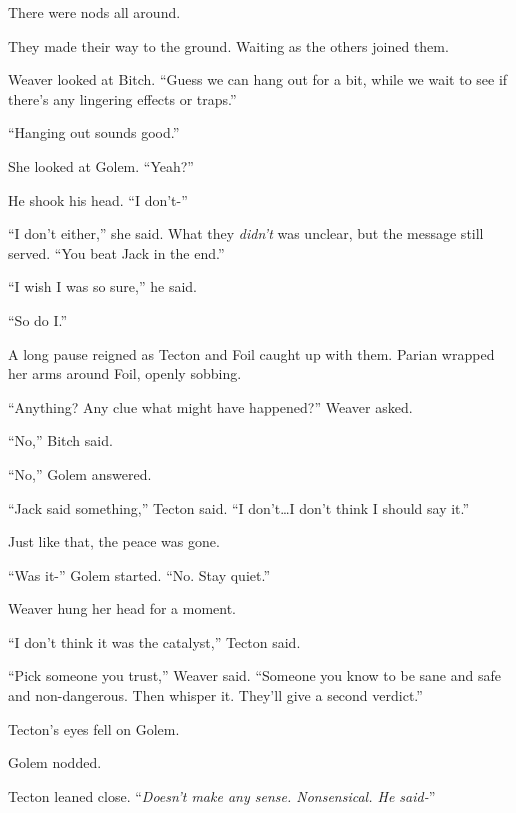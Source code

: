 There were nods all around.



They made their way to the ground.  Waiting as the others joined them.



Weaver looked at Bitch.  ``Guess we can hang out for a bit, while we wait to see if there's any lingering effects or traps.''



``Hanging out sounds good.''



She looked at Golem.  ``Yeah?''



He shook his head.  ``I don't-''



``I don't either,'' she said.  What they \emph{didn't }was unclear, but the message still served.  ``You beat Jack in the end.''



``I wish I was so sure,'' he said.



``So do I.''



A long pause reigned as Tecton and Foil caught up with them.  Parian wrapped her arms around Foil, openly sobbing.



``Anything?  Any clue what might have happened?''  Weaver asked.



``No,'' Bitch said.



``No,'' Golem answered.



``Jack said something,'' Tecton said.  ``I don't\ldots I don't think I should say it.''



Just like that, the peace was gone.



``Was it-'' Golem started.  ``No.  Stay quiet.''



Weaver hung her head for a moment.



``I don't think it was the catalyst,'' Tecton said.



``Pick someone you trust,'' Weaver said.  ``Someone you know to be sane and safe and non-dangerous.  Then whisper it.  They'll give a second verdict.''



Tecton's eyes fell on Golem.



Golem nodded.



Tecton leaned close.  ``\emph{Doesn't make any sense.  Nonsensical.  He said-}''





